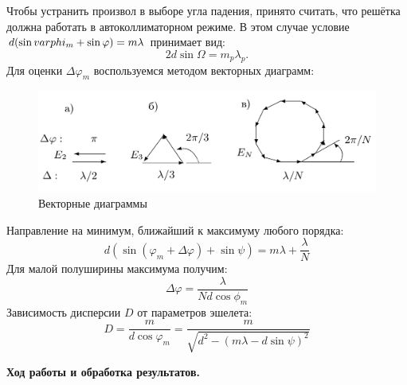 \documentclass[a4paper, 12pt]{article}%
\begin{document}
	Чтобы устранить произвол в выборе угла падения, принято считать, что решётка должна работать в автоколлиматорном режиме. В этом случае условие $d(\sin \\varphi_m + \sin \varphi) = m \lambda$ принимает вид:
\begin{equation}
	2d \sin \Omega = m_p \lambda_p.
\end{equation}
	Для оценки $\Delta \varphi_m$ воспользуемся методом векторных диаграмм:
	\begin{figure}[H]
		\begin{center}
		\includegraphics[width = 0.7\linewidth]{2.png}
		\caption{Векторные диаграммы}
	\end{center}
	\end{figure}
	Направление на минимум, ближайший к максимуму любого порядка:
\begin{equation}
	d(\sin(\varphi_m + \Delta \varphi) + \sin \psi) = m \lambda + \frac{\lambda}{N}
\end{equation}
	Для малой полуширины максимума получим:
\begin{equation}
	\Delta \varphi = \frac{\lambda}{Nd\cos \phi_m}
\end{equation}
	Зависимость дисперсии $D$ от параметров эшелета:
\begin{equation}
	D = \frac{m}{d \cos \varphi_m} = \frac{m}{\sqrt{d^2 - (m \lambda - d \sin \psi)^2}}
\end{equation}
	
	\newpage
	
	\textbf{Ход работы и обработка результатов.}\\
	
\end{document}
